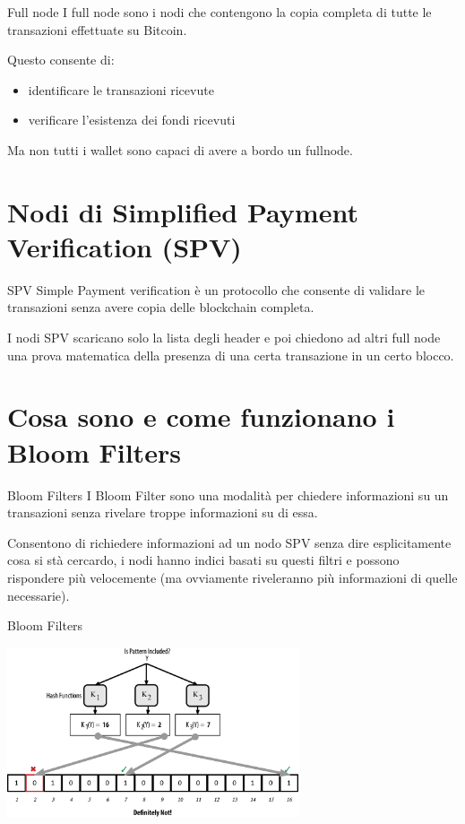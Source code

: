 \documentclass[aspectratio=169]{beamer}
\begin{document}
\begin{frame}{Full node}
    I full node sono i nodi che contengono la copia completa di tutte le transazioni effettuate su Bitcoin.

    Questo consente di:
    \begin{itemize}
        \item identificare le transazioni ricevute
        \item verificare l'esistenza dei fondi ricevuti
    \end{itemize}

    Ma non tutti i wallet sono capaci di avere a bordo un fullnode.
\end{frame}

\section{Nodi di Simplified Payment Verification (SPV)}

\begin{frame}{SPV}
    Simple Payment verification è un protocollo che consente di validare le transazioni senza avere copia delle blockchain completa.

    I nodi SPV scaricano solo la lista degli header e poi chiedono ad altri full node una prova matematica della presenza di una certa transazione in un certo blocco.
\end{frame}

\section{Cosa sono e come funzionano i Bloom Filters}

\begin{frame}{Bloom Filters}
    I Bloom Filter sono una modalità per chiedere informazioni su un transazioni senza rivelare troppe informazioni su di essa.

    Consentono di richiedere informazioni ad un nodo SPV senza dire esplicitamente cosa si stà cercardo, i nodi hanno indici basati su questi filtri e possono rispondere più velocemente (ma ovviamente riveleranno più informazioni di quelle necessarie).
\end{frame}

\begin{frame}{Bloom Filters}
    \begin{center}
        \includegraphics[height=5cm]{filter.png}
    \end{center}
\end{frame}
\end{document}
